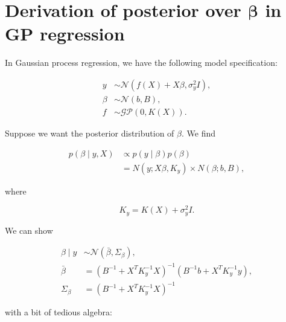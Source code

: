 \documentclass{draft}
\newcommand{\Ky}{\ensuremath{K_y}} %
\newcommand{\Kyi}{\ensuremath{K_y^{-1}}} %
\newcommand{\Bi}{\ensuremath{B^{-1}}} %
\begin{document}
% 
% 


\clearpage




\clearpage
\appendix

\section{Derivation of posterior over \( \boldsymbol\beta \) in GP regression}

In Gaussian process regression, we have the following model specification:

\begin{align}
    y & \sim \mathcal{N}( f(X) + X\beta, \sigma_y^2 I ), \\
    \beta & \sim \mathcal{N}( b, B ), \\
    f & \sim \mathcal{GP}( 0, K(X) ).
\end{align}

Suppose we want the posterior distribution of $\beta$.
We find

\begin{align}
    p(\beta \mid y, X)
    & \propto p(y \mid \beta) p(\beta) \\
    & = N(y; X\beta, \Ky) \times N(\beta; b, B),
\end{align}

where

\begin{equation}
    \Ky = K(X) + \sigma_y^2 I.
\end{equation}

We can show

\begin{align}
    \beta \mid y & \sim \mathcal{N}(\bar{\beta}, \Sigma_\beta), \\
    \bar{\beta} & = ( \Bi + X^T \Kyi X )^{-1} ( \Bi b + X^T \Kyi y ), \\
    \Sigma_\beta & = ( \Bi + X^T \Kyi X )^{-1}
\end{align}

with a bit of tedious algebra:
\end{document}
